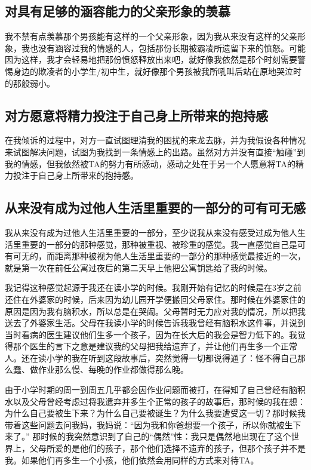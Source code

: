 
\subsection*{对具有足够的涵容能力的父亲形象的羡慕}

我不禁有点羡慕那个男孩能有这样的一个父亲形象，因为我从来没有这样的父亲形象，我也没有涵容过我的情感的人，包括那份长期被霸凌所遗留下来的愤怒。可能因为这样，我才会轻易地把那份愤怒释放出来吧，就好像我依然是那个时刻需要警惕身边的欺凌者的小学生/初中生，就好像那个男孩被我所吼叫后站在原地哭泣时的那般弱小。


\subsection*{对方愿意将精力投注于自己身上所带来的抱持感}

在我倾诉的过程中，对方一直试图理清我的困扰的来龙去脉，并为我假设各种情况来试图解决问题，试图为我找到一条情感上的出路。虽然对方并没有直接“触碰”到我的情感，但我依然被TA的努力有所感动，感动之处在于另一个人愿意将TA的精力投注于自己身上所带来的抱持感。


\subsection*{从来没有成为过他人生活里重要的一部分的可有可无感}

我从来没有成为过他人生活里重要的一部分，至少说我从来没有感受过成为他人生活里重要的一部分的那种感觉，那种被重视、被珍重的感觉。我一直感觉自己是可有可无的，而距离那种被视为他人生活里重要的一部分的那种感觉最接近的一次，就是第一次在前任公寓过夜后的第二天早上他把公寓钥匙给了我的时候。

我记得这种感觉起源于我还在读小学的时候。我刚开始有记忆的时候是在3岁之前还住在外婆家的时候，后来因为幼儿园开学便搬回父母家住。那时候在外婆家住的原因是因为我有脑积水，所以总是在哭闹。父母暂时无力应对我的情况，所以把我送去了外婆家生活。父母在我读小学的时候告诉我我曾经有脑积水这件事，并说到当时看病的医生建议他们生多一个孩子，因为在长大后的我会是智力低下的。我觉得那个医生的言下之意是建议我的父母把我给遗弃了，并让他们再生多一个正常人。还在读小学的我在听到这段故事后，突然觉得一切都说得通了：怪不得自己那么蠢、做作业那么慢、每晚的作业都做得那么晚。

由于小学时期的周一到周五几乎都会因作业问题而被打，在得知了自己曾经有脑积水以及父母曾经考虑过将我遗弃并多生个正常的孩子的故事后，那时候的我在想：为什么自己要被生下来？为什么自己要被诞生？为什么我要遭受这一切？那时候我带着这些问题去问我妈，我妈说：“因为我和你爸想要一个孩子，所以你就被生下来了。”   那时候的我突然意识到了自己的“偶然”性：我只是偶然地出现在了这个世界上，父母所爱的是他们的孩子，那个他们选择不遗弃的孩子，但那个孩子并不是我。如果他们再多生一个小孩，他们依然会用同样的方式来对待TA。

